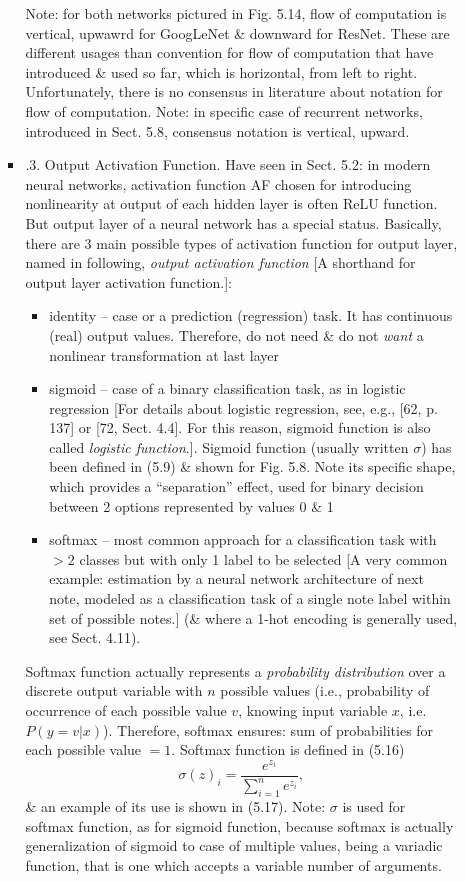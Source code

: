 \documentclass{article}
\begin{document}
\begin{itemize}
\begin{itemize}
\begin{itemize}
			Note: for both networks pictured in {\sf Fig. 5.14}, flow of computation is vertical, upwawrd for GoogLeNet \& downward for ResNet. These are different usages than convention for flow of computation that have introduced \& used so far, which is horizontal, from left to right. Unfortunately, there is no consensus in literature about notation for flow of computation. Note: in specific case of recurrent networks, introduced in Sect. 5.8, consensus notation is vertical, upward.
			\item {.3. Output Activation Function.} Have seen in Sect. 5.2: in modern neural networks, activation function AF chosen for introducing nonlinearity at output of each hidden layer is often ReLU function. But output layer of a neural network has a special status. Basically, there are 3 main possible types of activation function for output layer, named in following, {\it output activation function} [A shorthand for output layer activation function.]:
			\begin{itemize}
				\item identity -- case or a prediction (regression) task. It has continuous (real) output values. Therefore, do not need \& do not {\it want} a nonlinear transformation at last layer
				\item sigmoid -- case of a binary classification task, as in logistic regression [For details about logistic regression, see, e.g., [62, p. 137] or [72, Sect. 4.4]. For this reason, sigmoid function is also called {\it logistic function}.]. Sigmoid function (usually written $\sigma$) has been defined in (5.9) \& shown for {\sf Fig. 5.8}. Note its specific shape, which provides a ``separation'' effect, used for binary decision between 2 options represented by values 0 \& 1
				\item softmax -- most common approach for a classification task with $> 2$ classes but with only 1 label to be selected [A very common example: estimation by a neural network architecture of next note, modeled as a classification task of a single note label within set of possible notes.] (\& where a 1-hot encoding is generally used, see Sect. 4.11).
			\end{itemize}
			Softmax function actually represents a {\it probability distribution} over a discrete output variable with $n$ possible values (i.e., probability of occurrence  of each possible value $v$, knowing input variable $x$, i.e. $P(y = v|x)$). Therefore, softmax ensures: sum of probabilities for each possible value $= 1$. Softmax function is defined in (5.16)
			\begin{equation*}
				\sigma(z)_i = \frac{e^{z_i}}{\sum_{i=1}^n e^{z_i}},
			\end{equation*}
			\& an example of its use is shown in (5.17). Note: $\sigma$ is used for softmax function, as for sigmoid function, because softmax is actually generalization of sigmoid to case of multiple values, being a variadic function, that is one which accepts a variable number of arguments.


\end{itemize}
\end{itemize}
\end{itemize}
\end{document}
